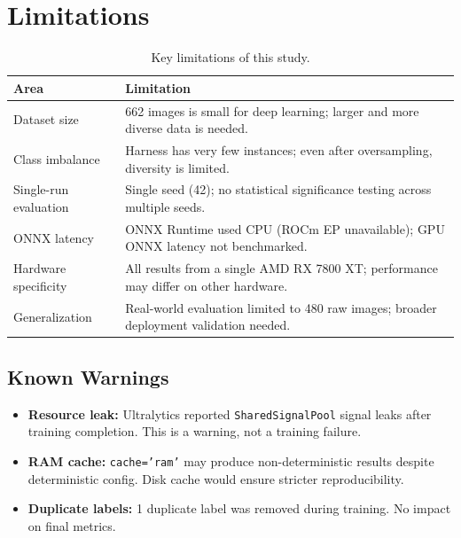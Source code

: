 \documentclass[a4paper,11pt]{article}
\begin{document}
\section{Limitations}

\begin{table}[H]
\centering
\small
\begin{tabular}{lp{9.5cm}}
\toprule
\textbf{Area} & \textbf{Limitation} \\
\midrule
Dataset size & 662 images is small for deep learning; larger and more diverse data is needed. \\
Class imbalance & Harness has very few instances; even after oversampling, diversity is limited. \\
Single-run evaluation & Single seed (42); no statistical significance testing across multiple seeds. \\
ONNX latency & ONNX Runtime used CPU (ROCm EP unavailable); GPU ONNX latency not benchmarked. \\
Hardware specificity & All results from a single AMD RX 7800 XT; performance may differ on other hardware. \\
Generalization & Real-world evaluation limited to 480 raw images; broader deployment validation needed. \\
\bottomrule
\end{tabular}
\caption{Key limitations of this study.}
\label{tab:limitations}
\end{table}

\subsection{Known Warnings}

\begin{itemize}[leftmargin=2cm, itemsep=2pt]
  \item \textbf{Resource leak:} Ultralytics reported \texttt{SharedSignalPool} signal leaks after training completion. This is a warning, not a training failure.
  \item \textbf{RAM cache:} \texttt{cache='ram'} may produce non-deterministic results despite deterministic config. Disk cache would ensure stricter reproducibility.
  \item \textbf{Duplicate labels:} 1 duplicate label was removed during training. No impact on final metrics.
\end{itemize}
\end{document}
